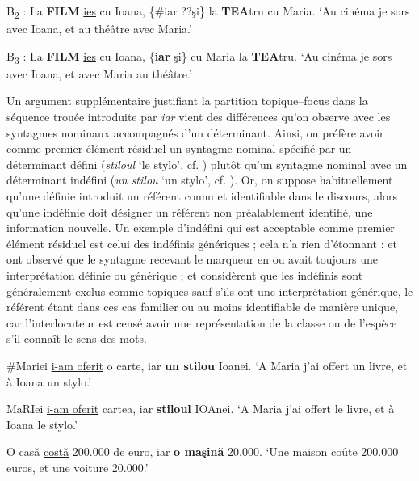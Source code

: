 \ex B\textsubscript{2} : La \textbf{FILM} \uline{ies} cu Ioana, \{\#iar {\textbar} ??şi\} la \textbf{TEA}tru cu Maria. \label{ch2:ex182b} 
\glt ‘Au cinéma je sors avec Ioana, et au théâtre avec Maria.’

\ex B\textsubscript{3} : La \textbf{FILM} \uline{ies} cu Ioana, \{\textbf{iar} {\textbar} şi\} cu Maria la \textbf{TEA}tru. \label{ch2:ex182c} 
\glt ‘Au cinéma je sors avec Ioana, et avec Maria au théâtre.’      
\z
\z

Un argument supplémentaire justifiant la partition topique--focus dans la séquence trouée introduite par \textit{iar} vient des différences qu’on observe avec les syntagmes nominaux accompagnés d’un déterminant. Ainsi, on préfère avoir comme premier élément résiduel un syntagme nominal spécifié par un déterminant défini (\textit{stiloul} ‘le stylo’, cf. ) plutôt qu’un syntagme nominal avec un déterminant indéfini (\textit{un stilou} ‘un stylo’, cf. ). Or, on suppose habituellement qu’une  définie introduit un référent connu et identifiable dans le discours, alors qu’une  indéfinie doit désigner un référent non préalablement identifié, {\cad} une information nouvelle. Un exemple d’indéfini qui est acceptable comme premier élément résiduel est celui des indéfinis génériques  ; cela n’a rien d’étonnant : \citet{Kuno1972} et \citet{Kuroda1972} ont observé que le syntagme recevant le marqueur  en  ou  avait toujours une interprétation définie ou générique ; \citet{Gundel1988} et \citet{GundelEtAl2004} considèrent que les indéfinis sont généralement exclus comme topiques sauf s’ils ont une interprétation générique, le référent étant dans ces cas familier ou au moins identifiable de manière unique, car l’interlocuteur est censé avoir une représentation de la classe ou de l’espèce s’il connaît le sens des mots. 

\ea \label{ch2:ex183}
\ea \#Mariei \uline{i-am oferit} o carte, iar \textbf{un stilou} Ioanei. \label{ch2:ex183a}
\glt ‘A Maria j’ai offert un livre, et à Ioana un stylo.’  

\ex MaRIei \uline{i-am oferit} cartea, iar \textbf{stiloul} IOAnei. \label{ch2:ex183b}
\glt ‘A Maria j’ai offert le livre, et à Ioana le stylo.’   

\ex  O casă \uline{costă} 200.000 de euro, iar \textbf{o maşină} 20.000. \label{ch2:ex183c}
\glt ‘Une maison coûte 200.000 euros, et une voiture 20.000.’      
\z
\z

